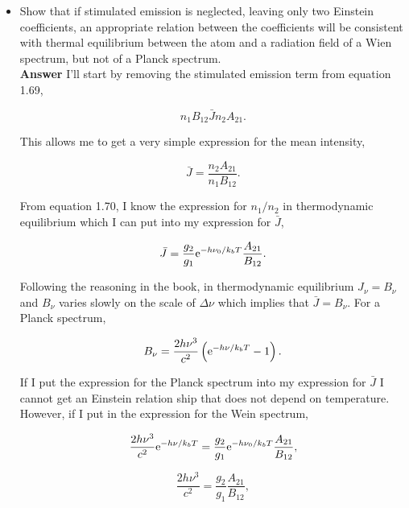 \documentclass[12pt]{article}
\begin{document}
\begin{itemize}

\item Show that if stimulated emission is neglected, leaving only two Einstein coefficients, an appropriate relation between the coefficients will be consistent with thermal equilibrium between the atom and a radiation field of a Wien spectrum, but not of a Planck spectrum. \\

\textbf{Answer} I'll start by removing the stimulated emission term from equation 1.69,

\begin{equation}
n_1B_{12}\bar{J} n_2A_{21}.
\end{equation}

\noindent This allows me to get a very simple expression for the mean intensity,

\begin{equation}
\bar{J} = \frac{n_2A_{21}}{n_1B_{12}}.
\end{equation}

\noindent From equation 1.70, I know the expression for $n_1/n_2$ in thermodynamic equilibrium which I can put into my expression for $\bar{J}$, 

\begin{equation}
\bar{J} = \frac{g_2}{g_1}{\rm e}^{-h\nu_0/k_bT}\frac{A_{21}}{B_{12}}.
\end{equation} 

\noindent Following the reasoning in the book, in thermodynamic equilibrium $J_\nu = B_\nu$ and $B_\nu$ varies slowly on the scale of $\Delta\nu$ which implies that $\bar{J} = B_\nu$. For a Planck spectrum,

\begin{equation}
B_\nu = \frac{2h\nu^3}{c^2} \left({\rm e}^{-h\nu/k_bT} - 1 \right).
\end{equation} 

\noindent If I put the expression for the Planck spectrum into my expression for $\bar{J}$ I cannot get an Einstein relation ship that does not depend on temperature. However, if I put in the expression for the Wein spectrum, 

\begin{equation}
\frac{2h\nu^3}{c^2} {\rm e}^{-h\nu/k_bT} =  \frac{g_2}{g_1}{\rm e}^{-h\nu_0/k_bT}\frac{A_{21}}{B_{12}}, 
\end{equation}

\begin{equation}
\frac{2h\nu^3}{c^2} =  \frac{g_2}{g_1}\frac{A_{21}}{B_{12}}, 
\end{equation}


\end{itemize}
\end{document}
